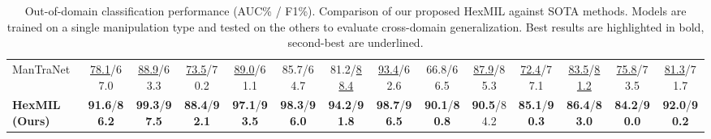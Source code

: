 \documentclass[sigconf, screen, review, anonymous]{acmart}
\begin{document}
\begin{table}[t]
\begin{adjustbox}{width=\textwidth, scale=2}
\begin{tabular}{L CCCCCCCCCCCC C}
        ManTraNet \cite{wu2019mantra}
            & \underline{\Huge 78.1}/67.0 & \underline{\Huge 88.9}/63.3 & \underline{\Huge 73.5}/70.2
            & \underline{\Huge 89.0}/61.1 & 85.7/64.7 & 81.2/\underline{\Huge 88.4}
            & \underline{\Huge 93.4}/62.6 & 66.8/66.5 & \underline{\Huge 87.9}/85.3
            & \underline{\Huge 72.4}/77.1 & \underline{\Huge 83.5}/\underline{\Huge 81.2} & \underline{\Huge 75.8}/73.5
            & \underline{\Huge 81.3}/71.7 \\

        \textbf{HexMIL (Ours)}
            & \textbf{\Huge 91.6}/\textbf{\Huge 86.2} & \textbf{\Huge 99.3}/\textbf{\Huge 97.5} & \textbf{\Huge 88.4}/\textbf{\Huge 92.1}
            & \textbf{\Huge 97.1}/\textbf{\Huge 93.5} & \textbf{\Huge 98.3}/\textbf{\Huge 96.0} & \textbf{\Huge 94.2}/\textbf{\Huge 91.8}
            & \textbf{\Huge 98.7}/\textbf{\Huge 96.5} & \textbf{\Huge 90.1}/\textbf{\Huge 80.8} & \textbf{\Huge 90.5}/84.2
            & \textbf{\Huge 85.1}/\textbf{\Huge 90.3} & \textbf{\Huge 86.4}/\textbf{\Huge 83.0} & \textbf{\Huge 84.2}/\textbf{\Huge 90.0}
            & \textbf{\Huge 92.0}/\textbf{\Huge 90.2} \\

        \bottomrule
    \end{tabular}
    \end{adjustbox}
    \caption{%
    Out-of-domain classification performance (AUC\% / F1\%). Comparison of our proposed HexMIL against SOTA methods. Models are trained on a single manipulation type and tested on the others to evaluate cross-domain generalization. Best results are highlighted in bold, second-best are underlined.
    }
    \label{tab:ood_cls}
    \vspace{-1em}
\end{table}
\end{document}
